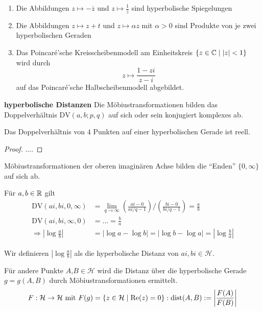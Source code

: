  \begin{bem}
    \begin{enumerate}[(1)]
      \item Die Abbildungen $z\mapsto -\overline{z}$ und $z\mapsto \frac{1}{\overline{z}}$ sind hyperbolische Spiegelungen
      \item Die Abbildungen $z\mapsto z+t$ und $z\mapsto \alpha z$ mit $\alpha>0$ sind Produkte von je zwei hyperbolischen Geraden 
      \item Das Poincaré'sche Kreisscheibenmodell am Einheitskreis $\lbrace z\in \mathbb C \mid \lvert z \rvert <1 \rbrace$ wird durch
            \begin{equation*}
              z \mapsto \frac{1-zi}{z-i}
            \end{equation*}
            auf das Poincaré'sche Halbscheibenmodell abgebildet.
    \end{enumerate}
  \end{bem}
  \textbf{hyperbolische Distanzen}
  Die Möbiustransformationen bilden das Doppelverhältnis $\text{DV}(a,b;p,q)$ auf sich oder sein konjugiert komplexes ab.
  \begin{thm}
    Das Doppelverhältnis von $4$ Punkten auf einer hyperbolischen Gerade ist reell.
  \end{thm}
  \begin{proof}
    ....
  \end{proof}
  
  \begin{bem}
    Möbiustransformationen der oberen imaginären Achse bilden die "`Enden"' $\lbrace 0,\infty \rbrace$ auf sich ab. \par
    Für $a,b \in \mathbb R$ gilt
    \begin{align*}
      \text{DV}(ai,bi,0,\infty) & = \lim_{q\to \infty} \left(\frac{ai-0}{ai/q-1}\right) \Big/ \left(\frac{bi-0}{bi/q-1}\right) = \frac{a}{b} \\
      \text{DV}(ai,bi,\infty,0) & = \ldots =\frac{b}{a} \\
      \Rightarrow \left\vert \log{\frac{a}{b}} \right\vert & = \lvert \log a - \log b \rvert = \lvert \log b - \log a \rvert = \left\vert \log{\frac{b}{a}} \right\vert
    \end{align*}
  \end{bem}
  
  \begin{defi}
    Wir definieren $\displaystyle{ \left\vert \log \frac{a}{b} \right \vert}$ als die hyperbolische Distanz von $ai, bi \in \mathcal{H}$.
  \end{defi}
  
  \begin{bem}
    Für andere Punkte $A$,$B \in \mathcal{H}$ wird die Distanz über die hyperbolische Gerade $g=g(A,B)$ durch Möbiustransformationen ermittelt.
    \begin{equation*}
      F:\mathcal{H} \to \mathcal{H} \text{ mit } F(g) = \lbrace z\in \mathcal{H} \mid \operatorname{Re}(z) = 0 \rbrace: \operatorname{dist}(A,B) := \left\vert \frac{F(A)}{F(B)} \right\vert
    \end{equation*}
  \end{bem}
